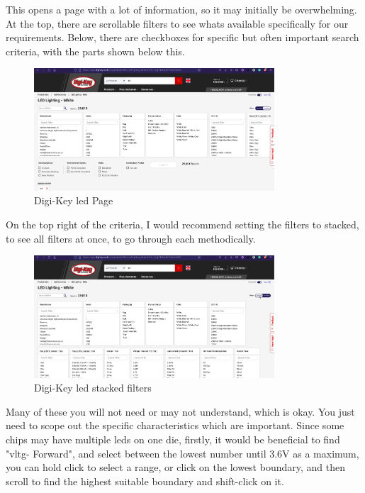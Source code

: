 \documentclass[a4paper,11pt]{report}
\begin{document}
This opens a page with a lot of information, so it may initially be overwhelming. At the top, there are scrollable filters to see whats available specifically for our requirements. Below, there are checkboxes for specific but often important search criteria, with the parts shown below this.

\begin{figure}[H]
\centering
\includegraphics[width=0.8\textwidth]{screenshots/DigiKeyWhiteledPage}
\caption{Digi-Key \gls{led} Page}
\end{figure}

On the top right of the criteria, I would recommend setting the filters to stacked, to see all filters at once, to go through each methodically.

\begin{figure}[H]
\centering
\includegraphics[width=0.8\textwidth]{screenshots/DigiKeyWhiteledPageStacked}
\caption{Digi-Key \gls{led} stacked filters}
\end{figure}

Many of these you will not need or may not understand, which is okay. You just need to scope out the specific characteristics which are important. Since some chips may have multiple \gls{led}s on one \gls{die}, firstly, it would be beneficial to find "\gls{vltg}- Forward", and select between the lowest number until 3.6V as a maximum, you can hold click to select a range, or click on the lowest boundary, and then scroll to find the highest suitable boundary and shift-click on it.
\end{document}
